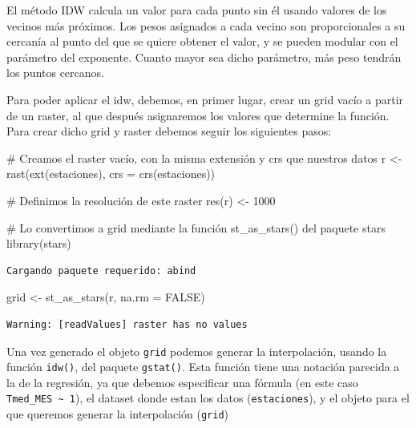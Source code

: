 \documentclass[
  letterpaper,
  DIV=11,
  numbers=noendperiod]{scrreprt}
\newenvironment{Shaded}{\begin{snugshade}}{\end{snugshade}}
\newcommand{\AttributeTok}[1]{\textcolor[rgb]{0.40,0.45,0.13}{#1}}
\newcommand{\CommentTok}[1]{\textcolor[rgb]{0.37,0.37,0.37}{#1}}
\newcommand{\ConstantTok}[1]{\textcolor[rgb]{0.56,0.35,0.01}{#1}}
\newcommand{\DecValTok}[1]{\textcolor[rgb]{0.68,0.00,0.00}{#1}}
\newcommand{\FunctionTok}[1]{\textcolor[rgb]{0.28,0.35,0.67}{#1}}
\newcommand{\NormalTok}[1]{\textcolor[rgb]{0.00,0.23,0.31}{#1}}
\newcommand{\OtherTok}[1]{\textcolor[rgb]{0.00,0.23,0.31}{#1}}
\begin{document}
El método IDW calcula un valor para cada punto sin él usando valores de
los vecinos más próximos. Los pesos asignados a cada vecino son
proporcionales a su cercanía al punto del que se quiere obtener el
valor, y se pueden modular con el parámetro del exponente. Cuanto mayor
sea dicho parámetro, más peso tendrán los puntos cercanos.

Para poder aplicar el idw, debemos, en primer lugar, crear un grid vacío
a partir de un raster, al que después asignaremos los valores que
determine la función. Para crear dicho grid y raster debemos seguir los
siguientes pasos:

\begin{Shaded}
\begin{Highlighting}[]
\CommentTok{\# Creamos el raster vacío, con la misma extensión y crs que nuestros datos}
\NormalTok{r }\OtherTok{\textless{}{-}} \FunctionTok{rast}\NormalTok{(}\FunctionTok{ext}\NormalTok{(estaciones), }\AttributeTok{crs =} \FunctionTok{crs}\NormalTok{(estaciones))}

\CommentTok{\# Definimos la resolución de este raster}
\FunctionTok{res}\NormalTok{(r) }\OtherTok{\textless{}{-}} \DecValTok{1000}

\CommentTok{\# Lo convertimos a grid mediante la función \textasciigrave{}st\_as\_stars()\textasciigrave{} del paquete \textasciigrave{}stars\textasciigrave{}}
\FunctionTok{library}\NormalTok{(stars)}
\end{Highlighting}
\end{Shaded}

\begin{verbatim}
Cargando paquete requerido: abind
\end{verbatim}

\begin{Shaded}
\begin{Highlighting}[]
\NormalTok{grid }\OtherTok{\textless{}{-}} \FunctionTok{st\_as\_stars}\NormalTok{(r, }\AttributeTok{na.rm =} \ConstantTok{FALSE}\NormalTok{)}
\end{Highlighting}
\end{Shaded}

\begin{verbatim}
Warning: [readValues] raster has no values
\end{verbatim}

Una vez generado el objeto \texttt{grid} podemos generar la
interpolación, usando la función \texttt{idw()}, del paquete
\texttt{gstat()}. Esta función tiene una notación parecida a la de la
regresión, ya que debemos especificar una fórmula (en este caso
\texttt{Tmed\_MES\ \textasciitilde{}\ 1}), el dataset donde estan los
datos (\texttt{estaciones}), y el objeto para el que queremos generar la
interpolación (\texttt{grid})
\end{document}
